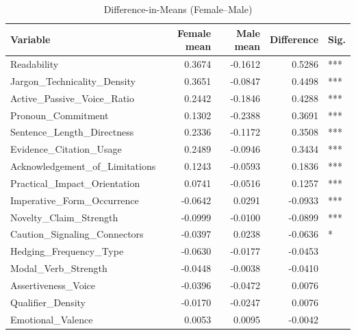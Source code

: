 \begin{table}
\caption{Difference-in-Means (Female–Male)}
\label{tab:diff_means}
\begin{tabular}{lrrrl}
\toprule
Variable & Female mean & Male mean & Difference & Sig. \\
\midrule
Readability & 0.3674 & -0.1612 & 0.5286 & *** \\
Jargon\_Technicality\_Density & 0.3651 & -0.0847 & 0.4498 & *** \\
Active\_Passive\_Voice\_Ratio & 0.2442 & -0.1846 & 0.4288 & *** \\
Pronoun\_Commitment & 0.1302 & -0.2388 & 0.3691 & *** \\
Sentence\_Length\_Directness & 0.2336 & -0.1172 & 0.3508 & *** \\
Evidence\_Citation\_Usage & 0.2489 & -0.0946 & 0.3434 & *** \\
Acknowledgement\_of\_Limitations & 0.1243 & -0.0593 & 0.1836 & *** \\
Practical\_Impact\_Orientation & 0.0741 & -0.0516 & 0.1257 & *** \\
Imperative\_Form\_Occurrence & -0.0642 & 0.0291 & -0.0933 & *** \\
Novelty\_Claim\_Strength & -0.0999 & -0.0100 & -0.0899 & *** \\
Caution\_Signaling\_Connectors & -0.0397 & 0.0238 & -0.0636 & * \\
Hedging\_Frequency\_Type & -0.0630 & -0.0177 & -0.0453 &  \\
Modal\_Verb\_Strength & -0.0448 & -0.0038 & -0.0410 &  \\
Assertiveness\_Voice & -0.0396 & -0.0472 & 0.0076 &  \\
Qualifier\_Density & -0.0170 & -0.0247 & 0.0076 &  \\
Emotional\_Valence & 0.0053 & 0.0095 & -0.0042 &  \\
\bottomrule
\end{tabular}
\end{table}
